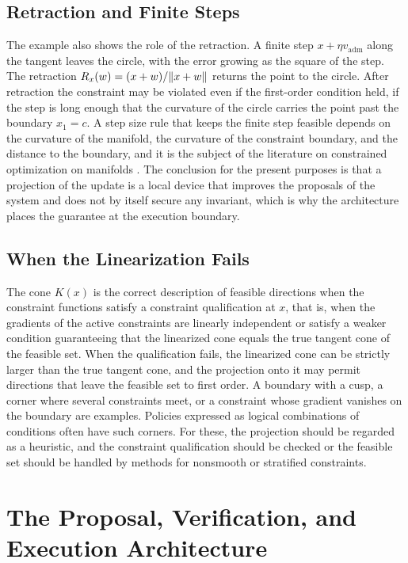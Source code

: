 \section{Retraction and Finite Steps}

The example also shows the role of the retraction. A finite step $x+\eta v_{\mathrm{adm}}$ along the tangent leaves the circle, with the error growing as the square of the step. The retraction $R_x(w)=(x+w)/\lVert x+w\rVert$ returns the point to the circle. After retraction the constraint may be violated even if the first-order condition held, if the step is long enough that the curvature of the circle carries the point past the boundary $x_1=c$. A step size rule that keeps the finite step feasible depends on the curvature of the manifold, the curvature of the constraint boundary, and the distance to the boundary, and it is the subject of the literature on constrained optimization on manifolds \cite{absil2008}. The conclusion for the present purposes is that a projection of the update is a local device that improves the proposals of the system and does not by itself secure any invariant, which is why the architecture places the guarantee at the execution boundary.

\section{When the Linearization Fails}

The cone $K(x)$ is the correct description of feasible directions when the constraint functions satisfy a constraint qualification at $x$, that is, when the gradients of the active constraints are linearly independent or satisfy a weaker condition guaranteeing that the linearized cone equals the true tangent cone of the feasible set. When the qualification fails, the linearized cone can be strictly larger than the true tangent cone, and the projection onto it may permit directions that leave the feasible set to first order. A boundary with a cusp, a corner where several constraints meet, or a constraint whose gradient vanishes on the boundary are examples. Policies expressed as logical combinations of conditions often have such corners. For these, the projection should be regarded as a heuristic, and the constraint qualification should be checked or the feasible set should be handled by methods for nonsmooth or stratified constraints.

\chapter{The Proposal, Verification, and Execution Architecture}
\label{ch:architecture}


